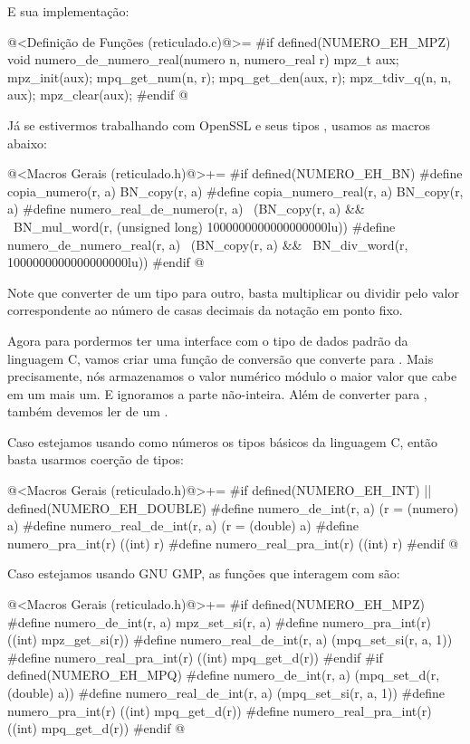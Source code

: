 E sua implementação:

\iniciocodigo
@<Definição de Funções (reticulado.c)@>=
#if defined(NUMERO_EH_MPZ)
void numero_de_numero_real(numero n, numero_real r){
  mpz_t aux;
  mpz_init(aux);
  mpq_get_num(n, r);
  mpq_get_den(aux, r);
  mpz_tdiv_q(n, n, aux);
  mpz_clear(aux);
}
#endif
@
\fimcodigo

Já se estivermos trabalhando com OpenSSL e seus tipos ,
usamos as macros abaixo:

\iniciocodigo
@<Macros Gerais (reticulado.h)@>+=
#if defined(NUMERO_EH_BN)
#define copia_numero(r, a) BN_copy(r, a)
#define copia_numero_real(r, a) BN_copy(r, a)
#define numero_real_de_numero(r, a) \
          (BN_copy(r, a) &&         \
          BN_mul_word(r, (unsigned long) 1000000000000000000lu))
#define numero_de_numero_real(r, a) \
          (BN_copy(r, a) &&         \
           BN_div_word(r, 1000000000000000000lu))
#endif
@
\fimcodigo

Note que converter de um tipo para outro, basta multiplicar ou dividir
pelo valor correspondente ao número de casas decimais da notação em
ponto fixo.

Agora para pordermos ter uma interface com o tipo de dados padrão da
linguagem C, vamos criar uma função de conversão que converte
para . Mais precisamente, nós armazenamos o valor
numérico módulo o maior valor que cabe em um  mais
um. E ignoramos a parte não-inteira. Além de converter
para , também devemos ler de um \monoespaco{int}.

Caso estejamos usando como números os tipos básicos da linguagem C,
então basta usarmos coerção de tipos:

\iniciocodigo
@<Macros Gerais (reticulado.h)@>+=
#if defined(NUMERO_EH_INT) || defined(NUMERO_EH_DOUBLE)
#define numero_de_int(r, a) (r = (numero) a)
#define numero_real_de_int(r, a) (r = (double) a)
#define numero_pra_int(r) ((int) r)
#define numero_real_pra_int(r) ((int) r)
#endif
@
\fimcodigo

Caso estejamos usando GNU GMP, as funções que interagem
com  são:

\iniciocodigo
@<Macros Gerais (reticulado.h)@>+=
#if defined(NUMERO_EH_MPZ)
#define numero_de_int(r, a) mpz_set_si(r, a)
#define numero_pra_int(r) ((int) mpz_get_si(r))
#define numero_real_de_int(r, a) (mpq_set_si(r, a, 1))
#define numero_real_pra_int(r) ((int) mpq_get_d(r))
#endif
#if defined(NUMERO_EH_MPQ)
#define numero_de_int(r, a) (mpq_set_d(r, (double) a))
#define numero_real_de_int(r, a) (mpq_set_si(r, a, 1))
#define numero_pra_int(r) ((int) mpq_get_d(r))
#define numero_real_pra_int(r) ((int) mpq_get_d(r))
#endif
@
\fimcodigo

